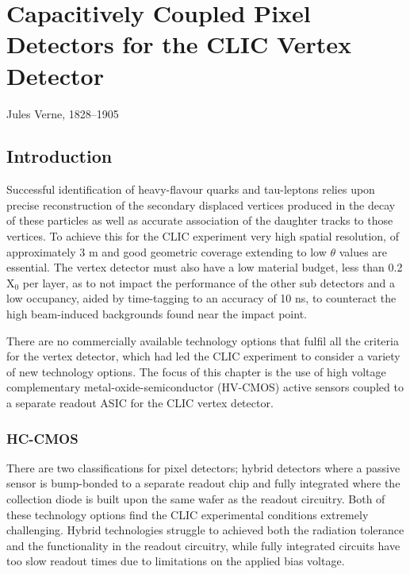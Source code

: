 \chapter{Capacitively Coupled Pixel Detectors for the CLIC Vertex Detector}
\label{chap:theory}

{Jules Verne, 1828--1905}

\section{Introduction}

Successful identification of heavy-flavour quarks and tau-leptons relies upon precise reconstruction of the secondary displaced vertices produced in the decay of these particles as well as accurate association of the daughter tracks to those vertices.  To achieve this for the CLIC experiment very high spatial resolution, of approximately 3 {\mu}m and good geometric coverage extending to low $\theta$ values are essential.  The vertex detector must also have a low material budget, less than 0.2 $\text{X}_{0}$ per layer, as to not impact the performance of the other sub detectors and a low occupancy, aided by time-tagging to an accuracy of 10 ns, to counteract the high beam-induced backgrounds found near the impact point.  

There are no commercially available technology options that fulfil all the criteria for the vertex detector, which had led the CLIC experiment to consider a variety of new technology options.  The focus of this chapter is the use of high voltage complementary metal-oxide-semiconductor (HV-CMOS) active sensors coupled to a separate readout ASIC for the CLIC vertex detector.  


\subsection{HC-CMOS}
There are two classifications for pixel detectors; hybrid detectors where a passive sensor is bump-bonded to a separate readout chip and fully integrated where the collection diode is built upon the same wafer as the readout circuitry.  Both of these technology options find the CLIC experimental conditions extremely challenging.  Hybrid technologies struggle to achieved both the radiation tolerance and the functionality in the readout circuitry, while fully integrated circuits have too slow readout times due to limitations on the applied bias voltage.  

